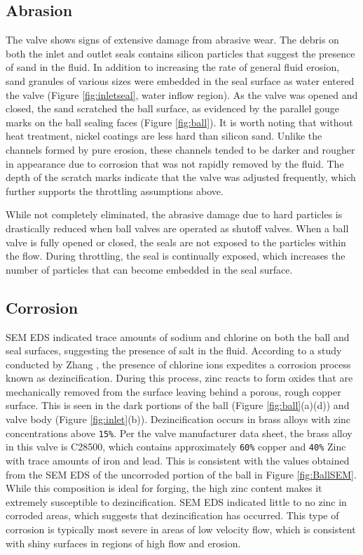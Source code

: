 \documentclass[]{article}
\begin{document}
\subsection{Abrasion}
The valve shows signs of extensive damage from abrasive wear. The debris on both the inlet and outlet seals contains silicon particles that suggest the presence of sand in the fluid. In addition to increasing the rate of general fluid erosion, sand granules of various sizes were embedded in the seal surface as water entered the valve (Figure \ref{fig:inletseal}, water inflow region). As the valve was opened and closed, the sand scratched the ball surface, as evidenced by the parallel gouge marks on the ball sealing faces (Figure \ref{fig:ball}). It is worth noting that without heat treatment, nickel coatings are less hard than silicon sand. Unlike the channels formed by pure erosion, these channels tended to be darker and rougher in appearance due to corrosion that was not rapidly removed by the fluid. The depth of the scratch marks indicate that the valve was adjusted frequently, which further supports the throttling assumptions above.

While not completely eliminated, the abrasive damage due to hard particles is drastically reduced when ball valves are operated as shutoff valves. When a ball valve is fully opened or closed, the seals are not exposed to the particles within the flow. During throttling, the seal is continually exposed, which increases the number of particles that can become embedded in the seal surface.

\subsection{Corrosion}
SEM EDS indicated trace amounts of sodium and chlorine on both the ball and seal surfaces, suggesting the presence of salt in the fluid. According to a study conducted by Zhang \cite{Zhang2009}, the presence of chlorine ions expedites a corrosion process known as dezincification. During this process, zinc reacts to form oxides that are mechanically removed from the surface leaving behind a porous, rough copper surface. This is seen in the dark portions of the ball (Figure \ref{fig:ball}(a)(d)) and valve body (Figure \ref{fig:inlet}(b)). Dezincification occurs in brass alloys with zinc concentrations above \verb|15%|. Per the valve manufacturer data sheet, the brass alloy in this valve is C28500, which contains approximately \verb|60%| copper and \verb|40%| Zinc with  trace amounts of iron and lead. This is consistent with the values obtained from the SEM EDS of the uncorroded portion of the ball in Figure \ref{fig:BallSEM}. While this composition is ideal for forging, the high zinc content makes it extremely susceptible to dezincification. SEM EDS indicated little to no zinc in corroded areas, which suggests that dezincification has occurred. This type of corrosion is typically most severe in areas of low velocity flow, which is consistent with shiny surfaces in regions of high flow and erosion.
\end{document}
